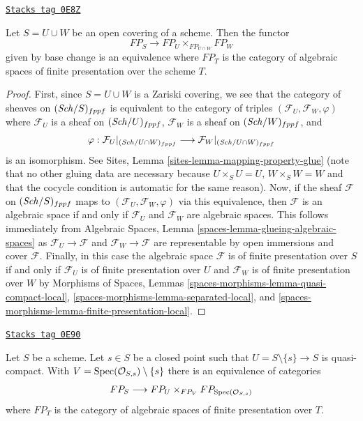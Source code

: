 \begin{lemma}
\label{spaces-limits-lemma-relative-glueing}
\href{https://stacks.math.columbia.edu/tag/0E8Z}{\texttt{Stacks tag 0E8Z}}

Let $S = U \cup W$ be an open covering of a scheme. Then the functor
$$
FP_S \longrightarrow FP_U \times_{FP_{U \cap W}} FP_W
$$
given by base change is an equivalence where $FP_T$
is the category of algebraic spaces of finite presentation over
the scheme $T$.
\end{lemma}

\begin{proof}
First, since $S = U \cup W$ is a Zariski covering, we see that the
category of sheaves on $(\mathit{Sch}/S)_{fppf}$ is equivalent to the category
of triples $(\mathcal{F}_U, \mathcal{F}_W, \varphi)$ where
$\mathcal{F}_U$ is a sheaf on $(\mathit{Sch}/U)_{fppf}$,
$\mathcal{F}_W$ is a sheaf on $(\mathit{Sch}/W)_{fppf}$, and
$$
\varphi :
\mathcal{F}_U|_{(\mathit{Sch}/U \cap W)_{fppf}}
\longrightarrow
\mathcal{F}_W|_{(\mathit{Sch}/U \cap W)_{fppf}}
$$
is an isomorphism. See Sites, Lemma \ref{sites-lemma-mapping-property-glue}
(note that no other gluing data are necessary because
$U \times_S U = U$, $W \times_S W = W$ and that the cocycle
condition is automatic for the same reason).
Now, if the sheaf $\mathcal{F}$ on $(\mathit{Sch}/S)_{fppf}$
maps to $(\mathcal{F}_U, \mathcal{F}_W, \varphi)$
via this equivalence, then $\mathcal{F}$ is an algebraic space
if and only if $\mathcal{F}_U$ and $\mathcal{F}_W$ are algebraic spaces.
This follows immediately from
Algebraic Spaces, Lemma \ref{spaces-lemma-glueing-algebraic-spaces}
as $\mathcal{F}_U \to \mathcal{F}$ and $\mathcal{F}_W \to \mathcal{F}$
are representable by open immersions and cover $\mathcal{F}$.
Finally, in this case the algebraic space $\mathcal{F}$ is of finite
presentation over $S$ if and only if $\mathcal{F}_U$ is of finite presentation
over $U$ and $\mathcal{F}_W$ is of finite presentation over $W$
by Morphisms of Spaces, Lemmas
\ref{spaces-morphisms-lemma-quasi-compact-local},
\ref{spaces-morphisms-lemma-separated-local}, and
\ref{spaces-morphisms-lemma-finite-presentation-local}.
\end{proof}

\begin{lemma}
\label{spaces-limits-lemma-glueing-near-closed-point}
\href{https://stacks.math.columbia.edu/tag/0E90}{\texttt{Stacks tag 0E90}}

Let $S$ be a scheme. Let $s \in S$ be a closed point such that
$U = S \setminus \{s\} \to S$ is quasi-compact. With
$V = \operatorname{Spec}(\mathcal{O}_{S, s}) \setminus \{s\}$ there is
an equivalence of categories
$$
FP_S \longrightarrow FP_U \times_{FP_V} FP_{\operatorname{Spec}(\mathcal{O}_{S, s})}
$$
where $FP_T$ is the category of algebraic spaces of finite presentation
over $T$.
\end{lemma}

